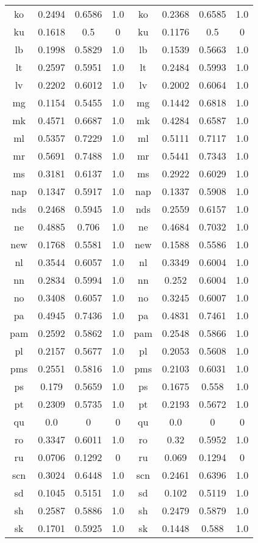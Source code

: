 \begin{figure}[h]
\centering
\begin{tabular}{cccc|cccc}
ko&0.2494&0.6586&1.0&	ko&0.2368&0.6585&1.0\\
ku&0.1618&0.5&0&	ku&0.1176&0.5&0\\
lb&0.1998&0.5829&1.0&	lb&0.1539&0.5663&1.0\\
lt&0.2597&0.5951&1.0&	lt&0.2484&0.5993&1.0\\
lv&0.2202&0.6012&1.0&	lv&0.2002&0.6064&1.0\\
mg&0.1154&0.5455&1.0&	mg&0.1442&0.6818&1.0\\
mk&0.4571&0.6687&1.0&	mk&0.4284&0.6587&1.0\\
ml&0.5357&0.7229&1.0&	ml&0.5111&0.7117&1.0\\
mr&0.5691&0.7488&1.0&	mr&0.5441&0.7343&1.0\\
ms&0.3181&0.6137&1.0&	ms&0.2922&0.6029&1.0\\
nap&0.1347&0.5917&1.0&	nap&0.1337&0.5908&1.0\\
nds&0.2468&0.5945&1.0&	nds&0.2559&0.6157&1.0\\
ne&0.4885&0.706&1.0&	ne&0.4684&0.7032&1.0\\
new&0.1768&0.5581&1.0&	new&0.1588&0.5586&1.0\\
nl&0.3544&0.6057&1.0&	nl&0.3349&0.6004&1.0\\
nn&0.2834&0.5994&1.0&	nn&0.252&0.6004&1.0\\
no&0.3408&0.6057&1.0&	no&0.3245&0.6007&1.0\\
pa&0.4945&0.7436&1.0&	pa&0.4831&0.7461&1.0\\
pam&0.2592&0.5862&1.0&	pam&0.2548&0.5866&1.0\\
pl&0.2157&0.5677&1.0&	pl&0.2053&0.5608&1.0\\
pms&0.2551&0.5816&1.0&	pms&0.2103&0.6031&1.0\\
ps&0.179&0.5659&1.0&	ps&0.1675&0.558&1.0\\
pt&0.2309&0.5735&1.0&	pt&0.2193&0.5672&1.0\\
qu&0.0&0&0&	qu&0.0&0&0\\
ro&0.3347&0.6011&1.0&	ro&0.32&0.5952&1.0\\
ru&0.0706&0.1292&0&	ru&0.069&0.1294&0\\
scn&0.3024&0.6448&1.0&	scn&0.2461&0.6396&1.0\\
sd&0.1045&0.5151&1.0&	sd&0.102&0.5119&1.0\\
sh&0.2587&0.5886&1.0&	sh&0.2479&0.5879&1.0\\
sk&0.1701&0.5925&1.0&	sk&0.1448&0.588&1.0\\

\end{tabular}
\end{figure}
